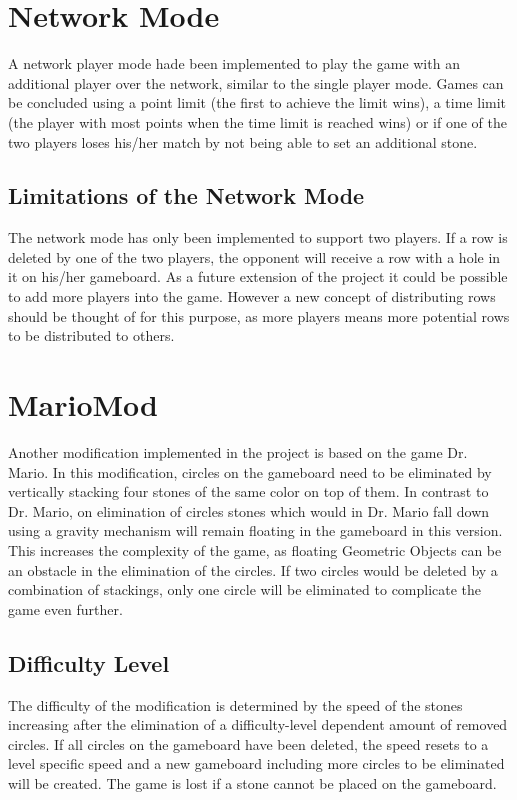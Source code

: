\documentclass[10pt,a4paper,titlepage]{article}
\begin{document}
	\section{Network Mode}
	A network player mode hade been implemented to play the game with an additional player over the network, similar to the single player mode. Games can be concluded using a point limit (the first to achieve the limit wins), a time limit (the player with most points when the time limit is reached wins) or if one of the two players loses his/her match by not being able to set an additional stone.
	\subsection{Limitations of the Network Mode}
	The network mode has only been implemented to support two players. If a row is deleted by one of the two players, the opponent will receive a row with a hole in it on his/her gameboard. As a future extension of the project it could be possible to add more players into the game. However a new concept of distributing rows should be thought of for this purpose, as more players means more potential rows to be distributed to others.
	\section{MarioMod}
	Another modification implemented in the project is based on the game Dr. Mario.
	In this modification, circles on the gameboard need to be eliminated by vertically stacking four stones of the same color on top of them. In contrast to Dr. Mario, on elimination of circles stones which would in Dr. Mario fall down using a gravity mechanism will remain floating in the gameboard in this version. This increases the complexity of the game, as floating Geometric Objects can be an obstacle in the elimination of the circles. If two circles would be deleted by a combination of stackings, only one circle will be eliminated to complicate the game even further.
	\subsection{Difficulty Level}
	The difficulty of the modification is determined by the speed of the stones increasing after the elimination of a difficulty-level dependent amount of removed circles. If all circles on the gameboard have been deleted, the speed resets to a level specific speed and a new gameboard including more circles to be eliminated will be created. The game is lost if a stone cannot be placed on the gameboard.
\end{document}
